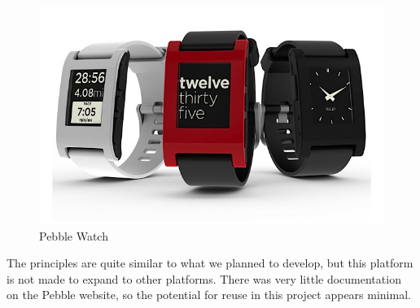 \begin{figure}[H]
\includegraphics[scale=0.7]{images/Pebble-Smartphone-Watch.jpeg}
\caption{Pebble Watch}
\end{figure}
The principles are quite similar to what we planned to develop, but this platform is not made to expand to other platforms. There was very little documentation on the Pebble website, so the potential for reuse in this project appears minimal.

